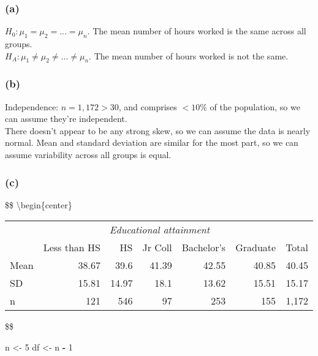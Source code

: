 \documentclass[]{article}
\newenvironment{Shaded}{\begin{snugshade}}{\end{snugshade}}
\newcommand{\DecValTok}[1]{\textcolor[rgb]{0.00,0.00,0.81}{#1}}
\newcommand{\StringTok}[1]{\textcolor[rgb]{0.31,0.60,0.02}{#1}}
\newcommand{\OperatorTok}[1]{\textcolor[rgb]{0.81,0.36,0.00}{\textbf{#1}}}
\newcommand{\NormalTok}[1]{#1}
\begin{document}
\subsubsection{(a)}\label{a-2}

\(H_0: \mu_1 = \mu_2 = ... = \mu_n\). The mean number of hours worked is
the same across all groups.\\
\(H_A: \mu_1 \neq \mu_2 \neq ... \neq \mu_n\). The mean number of hours
worked is not the same.

\subsubsection{(b)}\label{b-2}

Independence: \(n = 1,172 > 30\), and comprises \(< 10\%\) of the
population, so we can assume they're independent.\\
There doesn't appear to be any strong skew, so we can assume the data is
nearly normal. Mean and standard deviation are similar for the most
part, so we can assume variability across all groups is equal.

\subsubsection{(c)}\label{c-2}

\$\$ \textbackslash{}begin\{center\}

\begin{tabular}{l  r  r  r  r  r  r}
\multicolumn{1}{c}{}    & \multicolumn{5}{c}{\textit{Educational attainment}} \\
\cline{2-6}
                & Less than HS  & HS        & Jr Coll   & Bachelor's & Graduate & Total \\
\hline
Mean            & 38.67         & 39.6  & 41.39 & 42.55 & 40.85     & 40.45           \\
SD              & 15.81         & 14.97 & 18.1  & 13.62 & 15.51 & 15.17      \\
n               & 121           & 546   & 97        & 253   & 155   & 1,172 \\
\hline
\end{tabular}

\$\$

\begin{Shaded}
\begin{Highlighting}[]
\NormalTok{n <-}\StringTok{ }\DecValTok{5}
\NormalTok{df <-}\StringTok{ }\NormalTok{n }\OperatorTok{-}\StringTok{ }\DecValTok{1}
\end{Highlighting}
\end{Shaded}
\end{document}

